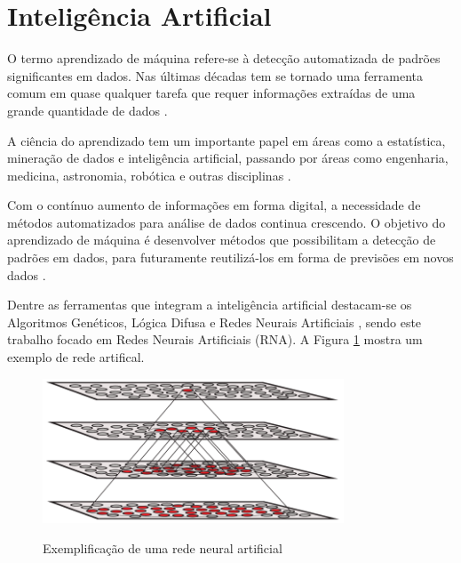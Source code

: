 \section{Inteligência Artificial}

O termo aprendizado de máquina refere-se à detecção automatizada de padrões significantes em dados. Nas últimas décadas tem se tornado uma ferramenta comum em quase qualquer tarefa que requer informações extraídas de uma grande quantidade de dados \cite{uml}.

A ciência do aprendizado tem um importante papel em áreas como a estatística, mineração de dados e inteligência artificial, passando por áreas como engenharia, medicina, astronomia, robótica e outras disciplinas \cite{statistical-learning}.

Com o contínuo aumento de informações em forma digital, a necessidade de métodos automatizados para análise de dados continua crescendo. O objetivo do aprendizado de máquina é desenvolver métodos que possibilitam a detecção de padrões em dados, para futuramente reutilizá-los em forma de previsões em novos dados \cite{mlpp}. 

Dentre as ferramentas que integram a inteligência artificial destacam-se os Algoritmos Genéticos, Lógica Difusa e Redes Neurais Artificiais \cite{ai-fili}, sendo este trabalho focado em Redes Neurais Artificiais (RNA). A Figura \ref{fig:rede-neural} mostra um exemplo de rede artifical.

\begin{figure}[h]
    \caption{Exemplificação de uma rede neural artificial}
    \centering
    \includegraphics[width=0.8\textwidth]{Textuais/Figuras/supervi.png}
    \label{fig:rede-neural}
\end{figure}